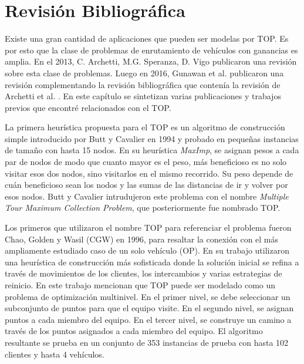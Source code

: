 

\chapter{Revisión Bibliográfica}

Existe una gran cantidad de aplicaciones que pueden ser modelas por TOP. Es por esto que la clase de problemas de enrutamiento de vehículos con ganancias es amplia. En el 2013, C. Archetti, M.G. Speranza, D. Vigo \cite{ArchettiSperanzaVigo} publicaron una revisión sobre esta clase de problemas. Luego en 2016, Gunawan et al. \cite{Gunawan} publicaron una revisión complementando la revisión bibliográfica que contenía la revisión de Archetti et al. \cite{ArchettiSperanzaVigo}. En este capítulo se sintetizan varias publicaciones y trabajos previos que encontré relacionados con el TOP.

\bigskip

La primera heurística propuesta para el TOP es un algoritmo de construcción simple introducido por Butt y Cavalier \cite{ButtCavalier} en 1994 y probado en pequeñas instancias de tamaño con hasta 15 nodos. En su heurística \textit{MaxImp}, se asignan pesos a cada par de nodos de modo que cuanto mayor es el peso, más beneficioso es no solo visitar esos dos nodos, sino visitarlos en el mismo recorrido. Su peso depende de cuán beneficioso sean los nodos y las sumas de las distancias de ir y volver por esos nodos. Butt y Cavalier intrudujeron este problema con el nombre \textit{Multiple Tour Maximum Collection Problem}, que posteriormente fue nombrado TOP.

\bigskip

Los primeros que utilizaron el nombre TOP para referenciar el problema fueron Chao, Golden y Wasil (CGW) \cite{ChaoGoldenWasil} en 1996, para resaltar la conexión con el más ampliamente estudiado caso de un solo vehículo (OP). En su trabajo utilizaron una heurística de construcción más sofisticada donde la solución inicial se refina a través de movimientos de los clientes, los intercambios y varias estrategias de reinicio. En este trabajo mencionan que TOP puede ser modelado como un problema de optimización multinivel. En el primer nivel, se debe seleccionar un subconjunto de puntos para que el equipo visite. En el segundo nivel, se asignan puntos a cada miembro del equipo. En el tercer nivel, se construye un camino a través de los puntos asignados a cada miembro del equipo. El algoritmo resultante se prueba en un conjunto de 353 instancias de prueba con hasta 102 clientes y hasta 4 vehículos.

